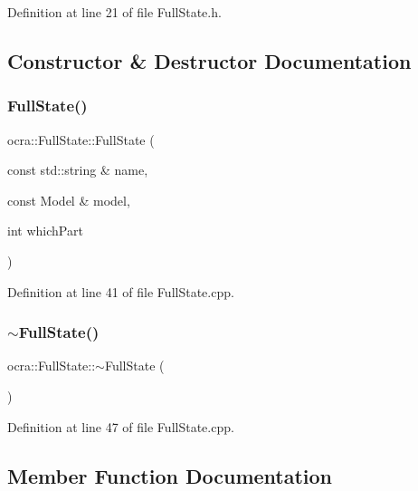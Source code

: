 Definition at line 21 of file Full\+State.\+h.



\subsection{Constructor \& Destructor Documentation}
\hypertarget{classocra_1_1FullState_ae30ccfdd99c72531c1218b270d00c5df}{}\label{classocra_1_1FullState_ae30ccfdd99c72531c1218b270d00c5df} 
\subsubsection{\texorpdfstring{Full\+State()}{FullState()}}
{\footnotesize\ttfamily ocra\+::\+Full\+State\+::\+Full\+State (\begin{DoxyParamCaption}\item[{const std\+::string \&}]{name,  }\item[{const Model \&}]{model,  }\item[{int}]{which\+Part }\end{DoxyParamCaption})}



Definition at line 41 of file Full\+State.\+cpp.

\hypertarget{classocra_1_1FullState_a7392bab88e107fe2862c01eb9c9bc1a4}{}\label{classocra_1_1FullState_a7392bab88e107fe2862c01eb9c9bc1a4} 
\subsubsection{\texorpdfstring{$\sim$\+Full\+State()}{~FullState()}}
{\footnotesize\ttfamily ocra\+::\+Full\+State\+::$\sim$\+Full\+State (\begin{DoxyParamCaption}{ }\end{DoxyParamCaption})\hspace{0.3cm}{\ttfamily [pure virtual]}}



Definition at line 47 of file Full\+State.\+cpp.



\subsection{Member Function Documentation}
\hypertarget{classocra_1_1FullState_a5d5c2ddfaf4868f78b4621d27b500784}{}\label{classocra_1_1FullState_a5d5c2ddfaf4868f78b4621d27b500784} 
